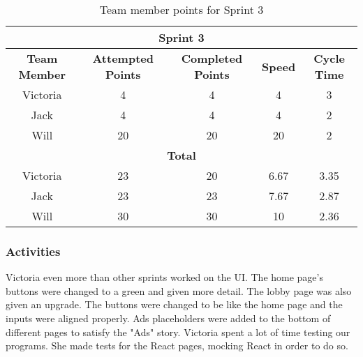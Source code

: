 \begin{table}[h]
\centering
\begin{tabular}{|ccccc|}
\hline
\multicolumn{5}{|c|}{\textbf{Sprint 3}}                                                                                                                                                                  \\ \hline
\multicolumn{1}{|c|}{\textbf{Team Member}} & \multicolumn{1}{c|}{\textbf{Attempted Points}} & \multicolumn{1}{c|}{\textbf{Completed Points}} & \multicolumn{1}{c|}{\textbf{Speed}} & \textbf{Cycle Time} \\ \hline
\multicolumn{1}{|c|}{Victoria}             & \multicolumn{1}{c|}{4}                         & \multicolumn{1}{c|}{4}                         & \multicolumn{1}{c|}{4}              & 3                   \\ \hline
\multicolumn{1}{|c|}{Jack}                 & \multicolumn{1}{c|}{4}                         & \multicolumn{1}{c|}{4}                         & \multicolumn{1}{c|}{4}              & 2                   \\ \hline
\multicolumn{1}{|c|}{Will}                 & \multicolumn{1}{c|}{20}                        & \multicolumn{1}{c|}{20}                        & \multicolumn{1}{c|}{20}             & 2                   \\ \hline
\multicolumn{5}{|c|}{\textbf{Total}}                                                                                                                                                                     \\ \hline
\multicolumn{1}{|c|}{Victoria}             & \multicolumn{1}{c|}{23}                        & \multicolumn{1}{c|}{20}                        & \multicolumn{1}{c|}{6.67}           & 3.35                \\ \hline
\multicolumn{1}{|c|}{Jack}                 & \multicolumn{1}{c|}{23}                        & \multicolumn{1}{c|}{23}                        & \multicolumn{1}{c|}{7.67}           & 2.87                \\ \hline
\multicolumn{1}{|c|}{Will}                 & \multicolumn{1}{c|}{30}                        & \multicolumn{1}{c|}{30}                        & \multicolumn{1}{c|}{10}             & 2.36                \\ \hline
\end{tabular}
\caption{Team member points for Sprint 3}
\label{Table 7}
\end{table}
\subsubsection{Activities}
Victoria even more than other sprints worked on the UI. The home page's buttons were changed to a green and given more detail. The lobby page was also given an upgrade. The buttons were changed to be like the home page and the inputs were aligned properly. Ads placeholders were added to the bottom of different pages to satisfy the "Ads" story. Victoria spent a lot of time testing our programs. She made tests for the React pages, mocking React in order to do so.

